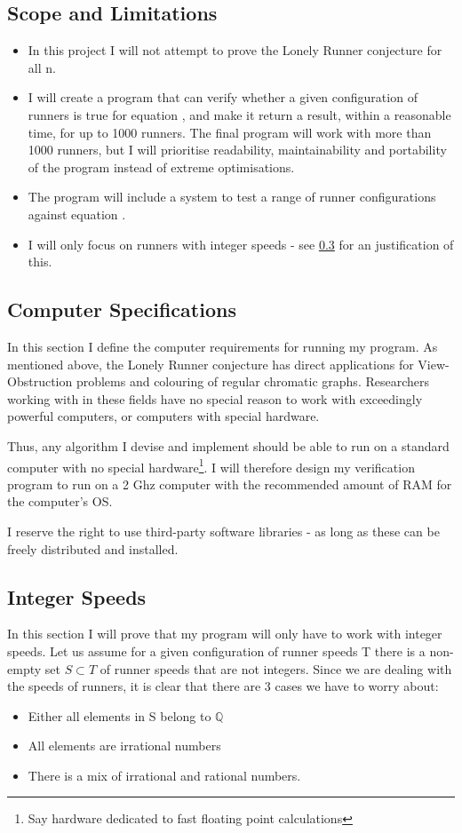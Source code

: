\subsection{Scope and Limitations}
\begin{itemize}
\item In this project I will not attempt to prove the Lonely Runner conjecture for all n. 
\item I will create a program that can verify whether a given configuration of runners is true for equation , and make it return a result, within a reasonable time, for up to 1000 runners. The final program will work with more than 1000 runners, but I will prioritise readability, maintainability and portability of the program instead of extreme optimisations. 
\item The program will include a system to test a range of runner configurations against equation .
\item I will only focus on runners with integer speeds - see \ref{integerSpeeds} for an justification of this.
\end{itemize}

\subsection{Computer Specifications}
\label{specs}
In this section I define the computer requirements for running my program. As mentioned above, the Lonely Runner conjecture has direct applications for View-Obstruction problems and colouring of regular chromatic graphs. Researchers working with in these fields have no special reason to work with exceedingly powerful computers, or computers with special hardware.
 
Thus, any algorithm I devise and implement should be able to run on a standard computer with no special hardware\footnote{Say hardware dedicated to fast floating point calculations}. I will therefore design my verification program to run on a 2 Ghz computer with the recommended amount of RAM for the computer's OS. 

I reserve the right to use third-party software libraries - as long as these can be freely distributed and installed.

\subsection{Integer Speeds}
\label{integerSpeeds}
In this section I will prove that my program will only have to work with integer speeds.
Let us assume for a given configuration of runner speeds T there is a non-empty set $S \subset T$ of runner speeds that are not integers. Since we are dealing with the speeds of runners, it is clear that there are 3 cases we have to worry about: 
\begin{itemize}
\item Either all elements in S belong to $\mathbb{Q}$
\item All elements are irrational numbers
\item There is a mix of irrational and rational numbers.
\end{itemize}

